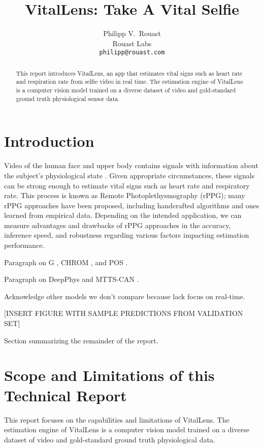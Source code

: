 \documentclass{article}
\title{VitalLens: Take A Vital Selfie}
\author{%
  Philipp V.~Rouast \\
  Rouast Labs\\
  \texttt{philipp@rouast.com} \\
}
\begin{document}
\maketitle


\begin{abstract}
This report introduces VitalLens, an app that estimates vital signs such as heart rate and respiration rate from selfie video in real time.
The estimation engine of VitalLens is a computer vision model trained on a diverse dataset of video and gold-standard ground truth physiological sensor data.
\end{abstract}


\section{Introduction}

Video of the human face and upper body contains signals with information about the subject's physiological state \citep{verkruysse2008remote}.
Given appropriate circumstances, these signals can be strong enough to estimate vital signs such as heart rate and respiratory rate.
This process is known as Remote Photoplethysmography (rPPG); many rPPG approaches have been proposed, including handcrafted algorithms and ones learned from empirical data.
Depending on the intended application, we can measure advantages and drawbacks of rPPG approaches in the accuracy, inference speed, and robustness regarding various factors impacting estimation performance.

Paragraph on G \cite{verkruysse2008remote}, CHROM \cite{de2013robust}, and POS \cite{wang2017algorithmic}.

Paragraph on DeepPhys \cite{chen2018deep} and MTTS-CAN \cite{liu2020multi}.

Acknowledge other models we don't compare because lack focus on real-time.

[INSERT FIGURE WITH SAMPLE PREDICTIONS FROM VALIDATION SET]

Section summarizing the remainder of the report.

\section{Scope and Limitations of this Technical Report}
\label{gen_inst}

This report focuses on the capabilities and limitations of VitalLens.
The estimation engine of VitalLens is a computer vision model trained on a diverse dataset of video and gold-standard ground truth physiological data.
\end{document}

